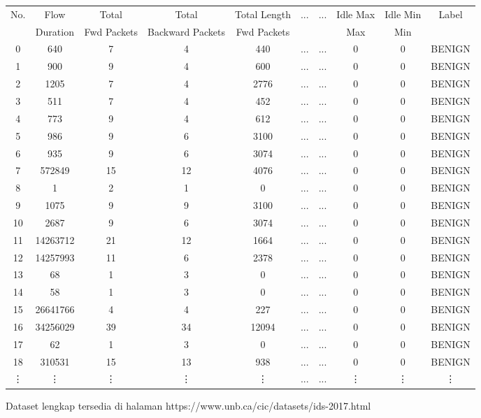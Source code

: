 \documentclass[a4paper,12pt]{report}
\begin{document}
\begin{landscape}
	\begin{table}[h!]
		\centering
		\begin{tabular}{|c|c|c|c|c|c|c|c|c|c|}
			\hline
			No. & Flow & Total  & Total & Total Length  & ... & ... & Idle Max & Idle Min & Label \\
			& Duration & Fwd Packets & Backward Packets & Fwd Packets &  &  & Max & Min &  \\
			\hline
			0 &640 &7 &4 &440 &... &... &0 &0 &BENIGN \\
			1 &900 &9 &4 &600 &... &... &0 &0 &BENIGN \\
			2 &1205 &7 &4 &2776 &... &... &0 &0 &BENIGN \\
			3 &511 &7 &4 &452 &... &... &0 &0 &BENIGN \\
			4 &773 &9 &4 &612 &... &... &0 &0 &BENIGN \\
			5 &986 &9 &6 &3100 &... &... &0 &0 &BENIGN \\
			6 &935 &9 &6 &3074 &... &... &0 &0 &BENIGN \\
			7 &572849 &15 &12 &4076 &... &... &0 &0 &BENIGN \\
			8 &1 &2 &1 &0 &... &... &0 &0 &BENIGN \\
			9 &1075 &9 &9 &3100 &... &... &0 &0 &BENIGN \\
			10 &2687 &9 &6 &3074 &... &... &0 &0 &BENIGN \\
			11 &14263712 &21 &12 &1664 &... &... &0 &0 &BENIGN \\
			12 &14257993 &11 &6 &2378 &... &... &0 &0 &BENIGN \\
			13 &68 &1 &3 &0 &... &... &0 &0 &BENIGN \\
			14 &58 &1 &3 &0 &... &... &0 &0 &BENIGN \\
			15 &26641766 &4 &4 &227 &... &... &0 &0 &BENIGN \\
			16 &34256029 &39 &34 &12094 &... &... &0 &0 &BENIGN \\
			17 &62 &1 &3 &0 &... &... &0 &0 &BENIGN \\
			18 &310531 &15 &13 &938 &... &... &0 &0 &BENIGN \\
			\vdots &\vdots & \vdots &\vdots &\vdots &... &... &\vdots &\vdots &\vdots \\
			\hline
		\end{tabular}
	\end{table}
	\noindent Dataset lengkap tersedia di halaman https://www.unb.ca/cic/datasets/ids-2017.html
\end{landscape}
\end{document}
